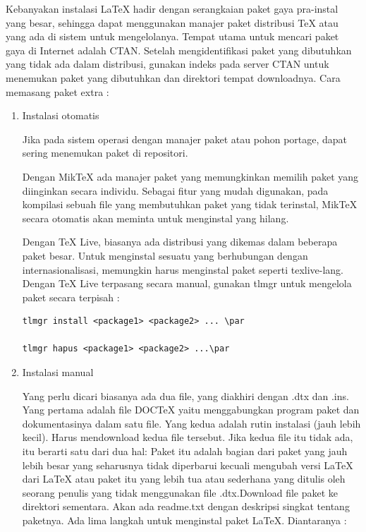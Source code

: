 \hspace{0.50in} Kebanyakan instalasi LaTeX hadir dengan serangkaian paket gaya pra-instal yang besar, sehingga dapat menggunakan manajer paket distribusi TeX atau yang ada di sistem untuk mengelolanya. Tempat utama untuk mencari paket gaya di Internet adalah CTAN. Setelah mengidentifikasi paket yang dibutuhkan yang tidak ada dalam distribusi, gunakan indeks pada server CTAN untuk menemukan paket yang dibutuhkan dan direktori tempat downloadnya. Cara memasang paket extra :\par
\begin{enumerate}
\item Instalasi otomatis\par

\hspace{0.50in} Jika pada sistem operasi dengan manajer paket atau pohon portage, dapat sering menemukan paket di repositori. \par

\hspace{0.50in} Dengan MikTeX ada manajer paket yang memungkinkan memilih paket yang diinginkan secara individu. Sebagai fitur yang mudah digunakan, pada kompilasi sebuah file yang membutuhkan paket yang tidak terinstal, MikTeX secara otomatis akan meminta untuk menginstal yang hilang.

\hspace{0.50in} Dengan TeX Live, biasanya ada distribusi yang dikemas dalam beberapa paket besar. Untuk menginstal sesuatu yang berhubungan dengan internasionalisasi, memungkin harus menginstal paket seperti texlive-lang. Dengan TeX Live terpasang secara manual, gunakan tlmgr untuk mengelola paket secara terpisah :
\begin{verbatim}
tlmgr install <package1> <package2> ... \par

tlmgr hapus <package1> <package2> ...\par
\end{verbatim}

\item Instalasi manual\par
\hspace{0.50in} Yang perlu dicari biasanya ada dua file, yang diakhiri dengan .dtx dan .ins. Yang pertama adalah file DOCTeX yaitu menggabungkan program paket dan dokumentasinya dalam satu file. Yang kedua adalah rutin instalasi (jauh lebih kecil). Harus mendownload kedua file tersebut. Jika kedua file itu tidak ada, itu berarti satu dari dua hal:     Paket itu adalah bagian dari paket yang jauh lebih besar yang seharusnya tidak diperbarui kecuali mengubah versi LaTeX dari LaTeX atau paket itu yang lebih tua atau sederhana yang ditulis oleh seorang penulis yang tidak menggunakan file .dtx.Download file paket ke direktori sementara. Akan ada readme.txt dengan deskripsi singkat tentang paketnya.  Ada lima langkah untuk menginstal paket LaTeX. Diantaranya :


\end{enumerate}
